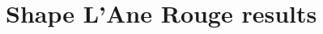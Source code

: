 \documentclass[../tech_report_1.tex]{subfiles}
\begin{document}

\section{Shape L'Ane Rouge results}
\end{document}

